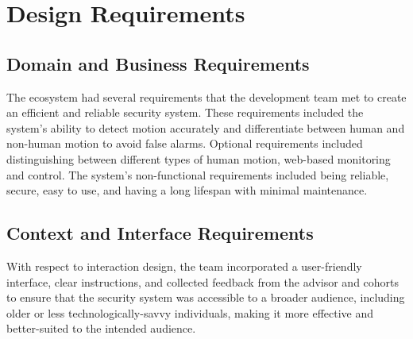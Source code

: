 \section{Design Requirements}\label{sec:system-requirements}

\subsection{Domain and Business Requirements}\label{subsec:domain-and-business-requirements}
The \brand{} ecosystem had several requirements that the development team met to
create an efficient and reliable security system. %
These requirements included the system's ability to detect motion accurately and differentiate between human and
non-human motion to avoid false alarms. %
Optional requirements included distinguishing between different types of human motion, web-based monitoring and control. %
The system's non-functional requirements included being reliable, secure,
easy to use, and having a long lifespan with minimal maintenance. %

\subsection{Context and Interface Requirements}\label{subsec:context-and-interface-requirements}

With respect to interaction design, the team incorporated a user-friendly interface, clear
instructions, and collected feedback from the advisor and cohorts to ensure that the
security system was accessible to a broader audience, including older or less
technologically-savvy individuals, making it more effective and better-suited to the
intended audience. %




